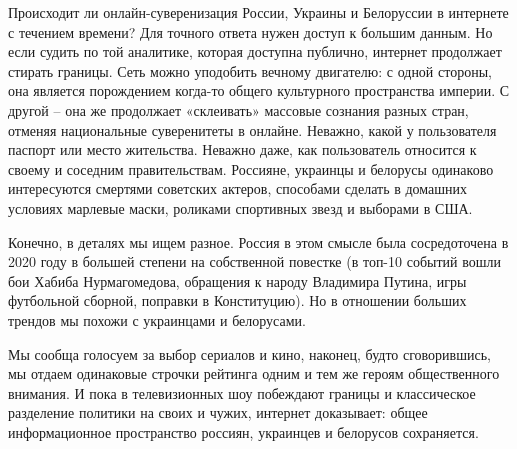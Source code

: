 Происходит ли онлайн-суверенизация России, Украины и Белоруссии в интернете с
течением времени? Для точного ответа нужен доступ к большим данным. Но если
судить по той аналитике, которая доступна публично, интернет продолжает стирать
границы. Сеть можно уподобить вечному двигателю: с одной стороны, она является
порождением когда-то общего культурного пространства империи. С другой – она же
продолжает «склеивать» массовые сознания разных стран, отменяя национальные
суверенитеты в онлайне. Неважно, какой у пользователя паспорт или место
жительства. Неважно даже, как пользователь относится к своему и соседним
правительствам. Россияне, украинцы и белорусы одинаково интересуются смертями
советских актеров, способами сделать в домашних условиях марлевые маски,
роликами спортивных звезд и выборами в США. 

Конечно, в деталях мы ищем разное. Россия в этом смысле была сосредоточена в
2020 году в большей степени на собственной повестке (в топ-10 событий вошли бои
Хабиба Нурмагомедова, обращения к народу Владимира Путина, игры футбольной
сборной, поправки в Конституцию). Но в отношении больших трендов мы похожи с
украинцами и белорусами.

Мы сообща голосуем за выбор сериалов и кино, наконец, будто сговорившись, мы
отдаем одинаковые строчки рейтинга одним и тем же героям общественного
внимания. И пока в телевизионных шоу побеждают границы и классическое
разделение политики на своих и чужих, интернет доказывает: общее информационное
пространство россиян, украинцев и белорусов сохраняется. 
